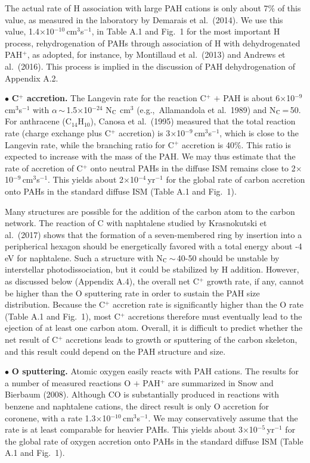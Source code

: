 \documentclass{aa}
\begin{document}
The actual rate of H association with large PAH cations is only about 7\% 
of this value, as measured in the laboratory by Demarais et al.\ (2014). We use  this value, 1.4$\times$10$^{-10}$\,cm$^3$s$^{-1}$, in Table A.1 and Fig.\ 1 for the most important H process,  rehydrogenation of PAHs through association of H with dehydrogenated PAH$^+$, as adopted, for instance, by  Montillaud et al.\ (2013) and Andrews et al.\ (2016). This process is implied in the discussion of PAH dehydrogenation of Appendix A.2.


$\bullet$ {\bf C$^+$ accretion.} 
The Langevin rate for the reaction C$^+$ $+$ PAH is about 6$\times$10$^{-9}$\,cm$^3$s$^{-1}$ with $\alpha$\,$\sim$\,1.5$\times$10$^{-24}$ N$_{\rm C}$ cm$^3$ (e.g.,\ Allamandola et al.\ 1989) and N$_{\rm C}$\,=\,50. 
For anthracene (C$_{14}$H$_{10}$), Canosa et al.\ (1995) measured that the total reaction rate (charge exchange plus C$^+$ accretion) is 3$\times$10$^{-9}$\,cm$^3$s$^{-1}$, which is close to the Langevin rate, while the branching ratio for C$^+$ accretion is 40\%. This ratio is expected to increase with the mass of the PAH. We may thus estimate that the rate of accretion of C$^+$ onto neutral PAHs in the diffuse ISM remains close to 2$\times$10$^{-9}$\,cm$^3$s$^{-1}$. This 
yields about 2$\times$10$^{-4}$\,yr$^{-1}$ for the global rate of carbon accretion onto PAHs in the standard diffuse ISM (Table A.1 and Fig.\ 1).

Many structures are possible for the addition of the carbon atom to the carbon network. The reaction  of C with naphtalene studied by Krasnokutski 
et al.\ (2017) shows that the formation of a seven-membered ring by insertion into a peripherical hexagon should be energetically favored with a total energy about -4\,eV for naphtalene. Such a structure with N$_{\rm C}$\,$\sim$\,40-50 should be unstable by interstellar photodissociation, but it could be stabilized by H addition.
However, as discussed below (Appendix A.4), the overall net C$^+$ growth rate, if any, cannot be higher than the O sputtering rate in order to sustain the PAH size  distribution. 
Because the C$^+$ accretion rate is significantly  higher than the O rate (Table A.1 and Fig.\ 1), most C$^+$ accretions therefore must eventually lead to the ejection of at least one carbon atom. Overall, it is difficult to predict whether the net result of C$^+$ accretions leads to growth or sputtering of the carbon skeleton, and this result could depend on the PAH structure and size.

$\bullet$ {\bf O sputtering.}
Atomic oxygen easily reacts with PAH cations. The results for a number of 
measured reactions O $+$ PAH$^+$ are summarized in Snow and Bierbaum (2008). Although CO is substantially produced in reactions with benzene and naphtalene cations, the direct result is only O accretion for coronene, with a rate 1.3$\times$10$^{-10}$\,cm$^3$s$^{-1}$. We may conservatively assume that the rate is at least comparable for heavier PAHs. This yields  about 3$\times$10$^{-5}$\,yr$^{-1}$ for the global rate of oxygen accretion onto PAHs in the standard diffuse ISM (Table A.1 and Fig.\ 1). 
\end{document}
